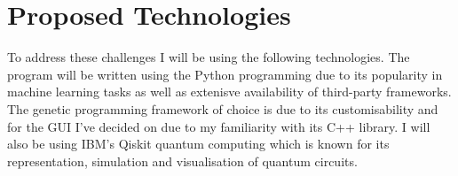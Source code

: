 \section{Proposed Technologies}
To address these challenges I will be using the following technologies. The program will be written using the Python programming  due to its popularity in machine learning tasks as well as extenisve availability of third-party frameworks. The genetic programming framework of choice is  due to its customisability and for the GUI I've decided on  due to my familiarity with its C++ library. I will also be using IBM's Qiskit quantum computing  which is known for its representation, simulation and visualisation of quantum circuits. 

